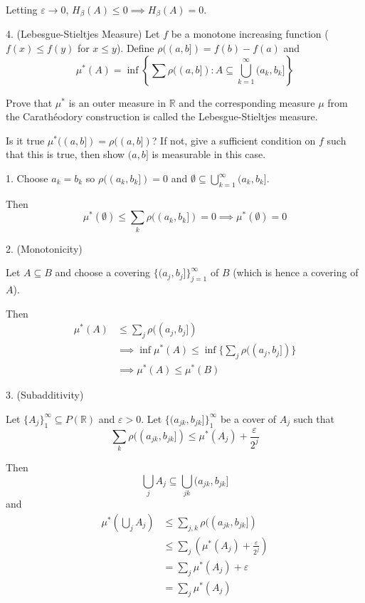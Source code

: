\documentclass[12pt]{article}
\newcommand{\R}{\mathbb{R}}
\newcommand{\ep}{\varepsilon}
\newcommand{\sub}{\subseteq}
\begin{document}
    Letting $\ep \to 0$, $H_{\beta}(A) \leq 0 \implies H_{\beta}(A) = 0$. 

\color{black}


\pagebreak 

4. (Lebesgue-Stieltjes Measure) Let $f$ be a monotone increasing function ($f(x) \leq f(y)$ for $x \leq y$). Define $\rho((a, b]) = f(b) - f(a)$ and 
\[\mu^*(A) = \inf\left\{\sum \rho((a, b]) : A \sub \bigcup_{k=1}^\infty (a_k, b_k]\right\}\]
    
Prove that $\mu^*$ is an outer measure in $\R$ and the corresponding measure $\mu$ from the Carathéodory construction is called the Lebesgue-Stieltjes measure. 

Is it true $\mu^*((a, b]) = \rho((a, b])$? If not, give a sufficient condition on $f$ such that this is true, then show $(a, b]$ is measurable in this case.

\color{blue}
    1. Choose $a_k = b_k$ so $\rho((a_k, b_k]) = 0$ and $\emptyset \sub \bigcup_{k=1}^\infty (a_k, b_k]$. 

    Then 
    \[\mu^*(\emptyset) \leq \sum_k \rho((a_k, b_k]) = 0 \implies \mu^*(\emptyset) = 0\]

    2. (Monotonicity)

    Let $A \sub B$ and choose a covering $\{(a_j, b_j]\}_{j=1}^{\infty}$ of $B$ (which is hence a covering of $A$). 

    Then 
    \begin{align*}
        \mu^*(A) &\leq \sum_j \rho((a_j, b_j])\\ 
        &\implies \inf \mu^*(A) \leq \inf\{\sum_j \rho((a_j, b_j])\} \\ 
        &\implies \mu^*(A) \leq \mu^*(B)
    \end{align*}

    3. (Subadditivity)

    Let $\{A_j\}_1^{\infty} \sub P(\R)$ and $\ep > 0$. Let $\{(a_{jk}, b_{jk}]\}_1^{\infty}$ be a cover of $A_j$ such that 
    \[\sum_k \rho((a_{jk}, b_{jk}]) \leq \mu^*(A_j) + \frac{\ep}{2^j}\]

    Then
    \[\bigcup_j A_j \sub \bigcup_{jk} (a_{jk}, b_{jk}]\]
    and 
    \begin{align*}
        \mu^*\left(\bigcup_j A_j\right) &\leq \sum_{j,k} \rho((a_{jk}, b_{jk}])\\ 
        &\leq \sum_j \left(\mu^*(A_j) + \frac{\ep}{2^j}\right)\\ 
        &= \sum_j \mu^*(A_j) + \ep\\ 
        &= \sum_j \mu^*(A_j)
    \end{align*}
\end{document}
